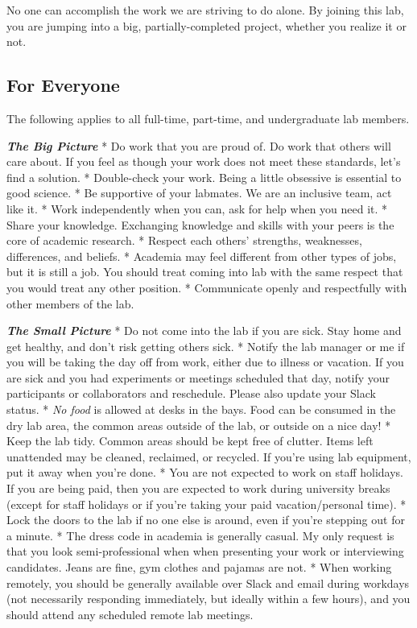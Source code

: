 \documentclass[
]{book}
\begin{document}
No one can accomplish the work we are striving to do alone. By joining this lab, you are jumping into a big, partially-completed project, whether you realize it or not.

\hypertarget{for-everyone}{%
\subsection{For Everyone}\label{for-everyone}}

The following applies to all full-time, part-time, and undergraduate lab members.

\textbf{\emph{The Big Picture}}
* Do work that you are proud of. Do work that others will care about. If you feel as though your work does not meet these standards, let's find a solution.
* Double-check your work. Being a little obsessive is essential to good science.
* Be supportive of your labmates. We are an inclusive team, act like it.
* Work independently when you can, ask for help when you need it.
* Share your knowledge. Exchanging knowledge and skills with your peers is the core of academic research.
* Respect each others' strengths, weaknesses, differences, and beliefs.
* Academia may feel different from other types of jobs, but it is still a job. You should treat coming into lab with the same respect that you would treat any other position.
* Communicate openly and respectfully with other members of the lab.

\textbf{\emph{The Small Picture}}
* Do not come into the lab if you are sick. Stay home and get healthy, and don't risk getting others sick.
* Notify the lab manager or me if you will be taking the day off from work, either due to illness or vacation. If you are sick and you had experiments or meetings scheduled that day, notify your participants or collaborators and reschedule. Please also update your Slack status.
* \emph{No food} is allowed at desks in the bays. Food can be consumed in the dry lab area, the common areas outside of the lab, or outside on a nice day!
* Keep the lab tidy. Common areas should be kept free of clutter. Items left unattended may be cleaned, reclaimed, or recycled. If you're using lab equipment, put it away when you're done.
* You are not expected to work on staff holidays. If you are being paid, then you are expected to work during university breaks (except for staff holidays or if you're taking your paid vacation/personal time).
* Lock the doors to the lab if no one else is around, even if you're stepping out for a minute.
* The dress code in academia is generally casual. My only request is that you look semi-professional when when presenting your work or interviewing candidates. Jeans are fine, gym clothes and pajamas are not.
* When working remotely, you should be generally available over Slack and email during workdays (not necessarily responding immediately, but ideally within a few hours), and you should attend any scheduled remote lab meetings.
\end{document}

